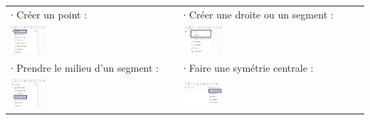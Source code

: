 \documentclass[a4paper,landscape,twocolumn,11pt,gray]{article}
\begin{document}
\begin{tabular}{p{}p{}}
	∙ Créer un point :                                                      & ∙ Créer une droite ou un segment :                                              \\
	\includegraphics[width=0.22\textwidth,frame]{Images/GeoGebra-Créer_point.png}  & \includegraphics[width=0.22\textwidth,frame]{Images/GeoGebra-Créer_droite_segment.png} \\
	∙ Prendre le milieu d'un segment :                                      & ∙ Faire une symétrie centrale :                                                 \\
	\includegraphics[width=0.22\textwidth,frame]{Images/GeoGebra-Créer_milieu.png} & \includegraphics[width=0.22\textwidth,frame]{Images/GeoGebra-symétrie_centrale.png}
\end{tabular}
\end{document}
